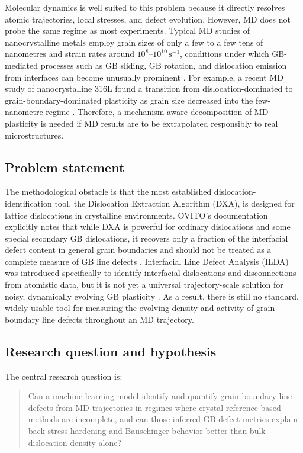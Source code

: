 Molecular dynamics is well suited to this problem because it directly resolves atomic trajectories, local stresses, and defect evolution. However, MD does not probe the same regime as most experiments. Typical MD studies of nanocrystalline metals employ grain sizes of only a few to a few tens of nanometres and strain rates around $10^{8}$--$10^{10}\,\mathrm{s^{-1}}$, conditions under which GB-mediated processes such as GB sliding, GB rotation, and dislocation emission from interfaces can become unusually prominent \cite{Materials2020,Huang2019}. For example, a recent MD study of nanocrystalline 316L found a transition from dislocation-dominated to grain-boundary-dominated plasticity as grain size decreased into the few-nanometre regime \cite{Materials2020}. Therefore, a mechanism-aware decomposition of MD plasticity is needed if MD results are to be extrapolated responsibly to real microstructures.

\subsection*{Problem statement}
The methodological obstacle is that the most established dislocation-identification tool, the Dislocation Extraction Algorithm (DXA), is designed for lattice dislocations in crystalline environments. OVITO's documentation explicitly notes that while DXA is powerful for ordinary dislocations and some special secondary GB dislocations, it recovers only a fraction of the interfacial defect content in general grain boundaries and should not be treated as a complete measure of GB line defects \cite{OVITODXA}. Interfacial Line Defect Analysis (ILDA) was introduced specifically to identify interfacial dislocations and disconnections from atomistic data, but it is not yet a universal trajectory-scale solution for noisy, dynamically evolving GB plasticity \cite{Deka2023}. As a result, there is still no standard, widely usable tool for measuring the evolving density and activity of grain-boundary line defects throughout an MD trajectory.

\subsection*{Research question and hypothesis}
The central research question is:

\begin{quote}
Can a machine-learning model identify and quantify grain-boundary line defects from MD trajectories in regimes where crystal-reference-based methods are incomplete, and can those inferred GB defect metrics explain back-stress hardening and Bauschinger behavior better than bulk dislocation density alone?
\end{quote}

